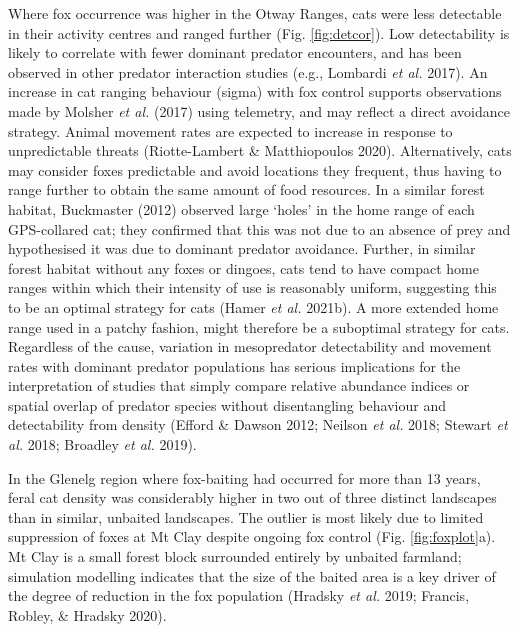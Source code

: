 \documentclass[11pt,a4paper,titlepage,twoside,openright]{style/unimelbthesis}
\begin{document}
\begin{mainmatter}
Where fox occurrence was higher in the Otway Ranges, cats were less detectable in their activity centres and ranged further (Fig. \ref{fig:detcor}). Low detectability is likely to correlate with fewer dominant predator encounters, and has been observed in other predator interaction studies (e.g., Lombardi \emph{et al.} 2017). An increase in cat ranging behaviour (sigma) with fox control supports observations made by Molsher \emph{et al.} (2017) using telemetry, and may reflect a direct avoidance strategy. Animal movement rates are expected to increase in response to unpredictable threats (Riotte-Lambert \& Matthiopoulos 2020). Alternatively, cats may consider foxes predictable and avoid locations they frequent, thus having to range further to obtain the same amount of food resources. In a similar forest habitat, Buckmaster (2012) observed large `holes' in the home range of each GPS-collared cat; they confirmed that this was not due to an absence of prey and hypothesised it was due to dominant predator avoidance. Further, in similar forest habitat without any foxes or dingoes, cats tend to have compact home ranges within which their intensity of use is reasonably uniform, suggesting this to be an optimal strategy for cats (Hamer \emph{et al.} 2021b). A more extended home range used in a patchy fashion, might therefore be a suboptimal strategy for cats. Regardless of the cause, variation in mesopredator detectability and movement rates with dominant predator populations has serious implications for the interpretation of studies that simply compare relative abundance indices or spatial overlap of predator species without disentangling behaviour and detectability from density (Efford \& Dawson 2012; Neilson \emph{et al.} 2018; Stewart \emph{et al.} 2018; Broadley \emph{et al.} 2019).

In the Glenelg region where fox-baiting had occurred for more than 13 years, feral cat density was considerably higher in two out of three distinct landscapes than in similar, unbaited landscapes. The outlier is most likely due to limited suppression of foxes at Mt Clay despite ongoing fox control (Fig. \ref{fig:foxplot}a). Mt Clay is a small forest block surrounded entirely by unbaited farmland; simulation modelling indicates that the size of the baited area is a key driver of the degree of reduction in the fox population (Hradsky \emph{et al.} 2019; Francis, Robley, \& Hradsky 2020).


\end{mainmatter}
\end{document}
